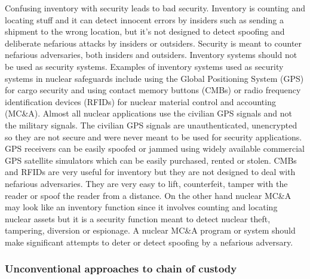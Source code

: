 \documentclass[twoside,titlepage,11pt,twocolumn,a4paper]{article}
\begin{document}
Confusing inventory with security leads to bad security. Inventory is
counting and locating stuff and it can detect innocent errors by
insiders such as sending a shipment to the wrong location, but it’s
not designed to detect spoofing and deliberate nefarious attacks by
insiders or outsiders. \citep{handbookSecBlunders2010} Security is
meant to counter nefarious adversaries, both insiders and
outsiders. \citep{insiderThreat2011} Inventory systems should not be
used as security systems. Examples of inventory systems used as
security systems in nuclear safeguards include using the Global
Positioning System (GPS) for cargo security and using contact memory
buttons (CMBs) or radio frequency identification devices (RFIDs) for
nuclear material control and accounting
(MC\&A). \citep{handbookSecBlunders2010} Almost all nuclear
applications use the civilian GPS signals and not the military
signals.  The civilian GPS signals are unauthenticated, unencrypted so
they are not secure and were never meant to be used for security
applications. GPS receivers can be easily spoofed or jammed using
widely available commercial GPS satellite simulators which can be
easily purchased, rented or stolen. CMBs and RFIDs are very useful for
inventory but they are not designed to deal with nefarious
adversaries. They are very easy to lift, counterfeit, tamper with the
reader or spoof the reader from a
distance. \citep{nuclearSafeguardsAndSec2005} On the other hand
nuclear MC\&A may look like an inventory function since it involves
counting and locating nuclear assets but it is a security function
meant to detect nuclear theft, tampering, diversion or espionage.  A
nuclear MC\&A program or system should make significant attempts to
deter or detect spoofing by a nefarious
adversary. \citep{handbookSecBlunders2010}

\subsubsection{Unconventional approaches to chain of custody}
\end{document}
